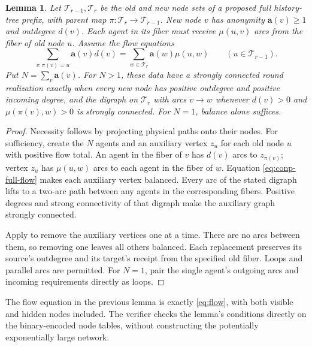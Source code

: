 \documentclass[11pt]{article}
\newcommand{\anon}{\mathbf a}
\newtheorem{lemma}{Lemma}
\begin{document}
\begin{lemma}
\label{lem:conp-transition}
Let \(\mathcal T_{r-1},\mathcal T_r\) be the old and new node sets
of a proposed full history-tree prefix, with parent map
\(\pi:\mathcal T_r\to\mathcal T_{r-1}\).  New node \(v\) has
anonymity \(\anon(v)\geq1\) and outdegree \(d(v)\).  Each agent in
its fiber must receive \(\mu(u,v)\) arcs from the fiber of old
node \(u\).  Assume the flow equations
\begin{equation}
 \sum_{v:\pi(v)=u}\anon(v)d(v)
 =\sum_{w\in\mathcal T_r}\anon(w)\mu(u,w)
 \qquad(u\in\mathcal T_{r-1}).
 \label{eq:conp-full-flow}
\end{equation}
Put \(N=\sum_v \anon(v)\).  For \(N>1\), these data have a strongly
connected round realization exactly when every new node has positive
outdegree and positive incoming degree, and the digraph on
\(\mathcal T_r\) with arcs
\(v\to w\) whenever \(d(v)>0\) and \(\mu(\pi(v),w)>0\)
is strongly connected.  For \(N=1\), balance alone suffices.
\end{lemma}

\begin{proof}
Necessity follows by projecting physical paths onto their nodes.
For sufficiency, create the \(N\) agents and an auxiliary vertex
\(z_u\) for each old node \(u\) with positive flow total.
An agent in the fiber of \(v\) has \(d(v)\) arcs to
\(z_{\pi(v)}\); vertex \(z_u\) has \(\mu(u,w)\) arcs to
each agent in the fiber of \(w\).  Equation
\eqref{eq:conp-full-flow} makes each auxiliary vertex balanced.
Every arc of the stated digraph lifts to a two-arc path between
any agents in the corresponding fibers.  Positive degrees and
strong connectivity of that digraph make the auxiliary graph
strongly connected.

Apply  to remove the auxiliary
vertices one at a time.  There are no arcs between them, so removing
one leaves all others balanced.  Each replacement preserves its
source's outdegree and its target's receipt from the specified old
fiber.  Loops and parallel arcs are permitted.  For \(N=1\),
pair the single agent's outgoing arcs and incoming requirements
directly as loops.
\end{proof}

The flow equation in the previous lemma is exactly \eqref{eq:flow},
with both visible and hidden nodes included. The verifier checks the
lemma's conditions directly on the binary-encoded node tables, without
constructing the potentially exponentially large network.
\end{document}
